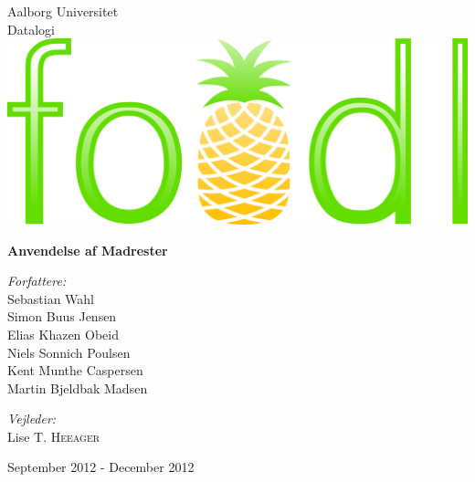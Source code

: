 \begin{titlingpage}
\color{fpcolor}
\centering
\vspace*{1.0cm}

\LARGE Aalborg Universitet\\[0.75cm]
\Large Datalogi\\[1.75cm]

\includegraphics{billeder/logo.png}

\vspace{2.0cm}
{ \fontsize{26.2pt}{26.2pt} \bfseries Anvendelse af Madrester}
\vspace{0.5cm}
\vspace{0.75cm}

\begin{minipage}{13.37cm}
  \begin{flushleft} \large
    \vspace{0pt}
    \emph{Forfattere:}\\
    Sebastian Wahl\\
    Simon Buus Jensen\\
    Elias Khazen Obeid\\
    Niels Sonnich Poulsen\\
    Kent Munthe Caspersen\\
    Martin Bjeldbak Madsen\\
  \end{flushleft}

  \begin{flushright} \large
    \vspace{-112pt}
    \emph{Vejleder:}\\
    Lise T. \textsc{Heeager}
  \end{flushright}
\end{minipage}

\vfill

{\large September 2012 - December 2012}

\end{titlingpage}
